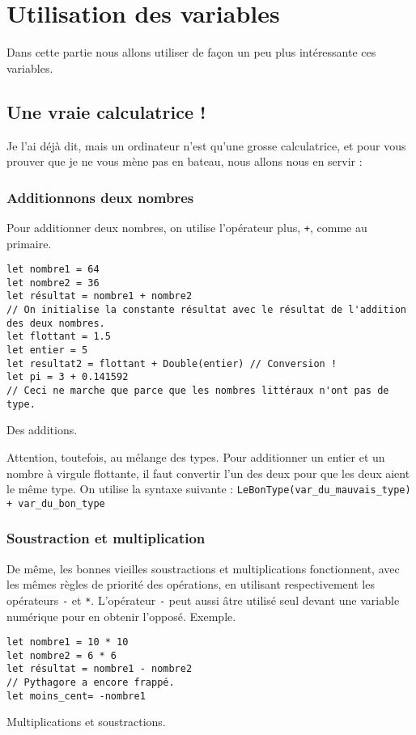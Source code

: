 \chapter{Utilisation des variables}

Dans cette partie nous allons utiliser de façon un peu plus intéressante ces variables.

\section{Une vraie calculatrice !}
Je l'ai déjà dit, mais un ordinateur n'est qu'une grosse calculatrice, et pour vous prouver que
je ne vous mène pas en bateau, nous allons nous en servir :
\subsection{Additionnons deux nombres}
Pour additionner deux nombres, on utilise l'opérateur plus, \verb"+", comme au primaire.
\begin{listing}
\begin{verbatim}
let nombre1 = 64
let nombre2 = 36
let résultat = nombre1 + nombre2
// On initialise la constante résultat avec le résultat de l'addition des deux nombres.
let flottant = 1.5
let entier = 5
let resultat2 = flottant + Double(entier) // Conversion !
let pi = 3 + 0.141592 
// Ceci ne marche que parce que les nombres littéraux n'ont pas de type.
\end{verbatim}
\caption{Des additions.}
\end{listing}

Attention, toutefois, au mélange des types. Pour additionner un entier et un nombre à virgule flottante, il faut convertir l'un des deux pour que les deux aient le même type.
On utilise la syntaxe suivante : \texttt{LeBonType(var_du_mauvais_type) + var_du_bon_type}
\subsection{Soustraction et multiplication}
De même, les bonnes vieilles soustractions et multiplications fonctionnent, avec les mêmes règles de priorité des opérations, en utilisant respectivement les opérateurs \verb"-" et \verb"*".
L'opérateur \verb"-" peut aussi âtre utilisé seul devant une variable numérique pour en obtenir l'opposé.
Exemple.
\begin{listing}
\begin{verbatim}
let nombre1 = 10 * 10
let nombre2 = 6 * 6
let résultat = nombre1 - nombre2
// Pythagore a encore frappé. 
let moins_cent= -nombre1
\end{verbatim}
\caption{Multiplications et soustractions.}
\end{listing}


